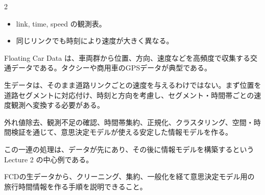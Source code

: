 \begin{multicols}{2}

\footnotesize

\raggedcolumns


\begin{itemize}
\item link, time, speed の観測表。
\item 同じリンクでも時刻により速度が大きく異なる。
\end{itemize}

Floating Car Data は、車両群から位置、方向、速度などを高頻度で収集する交通データである。タクシーや商用車のGPSデータが典型である。\par

生データは、そのまま道路リンクごとの速度を与えるわけではない。まず位置を道路セグメントに対応付け、時刻と方向を考慮し、セグメント・時間帯ごとの速度観測へ変換する必要がある。\par

外れ値除去、観測不足の確認、時間帯集約、正規化、クラスタリング、空間・時間検証を通じて、意思決定モデルが使える安定した情報モデルを作る。\par

この一連の処理は、データが先にあり、その後に情報モデルを構築するという Lecture 2 の中心例である。\par

FCDの生データから、クリーニング、集約、一般化を経て意思決定モデル用の旅行時間情報を作る手順を説明できること。\par



\end{multicols}
